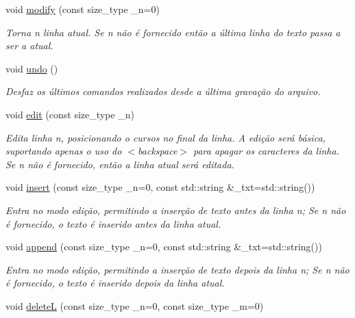 \begin{DoxyCompactItemize}
void \hyperlink{classelis_a863421e1b739bbaa727da3ec66333248}{modify} (const size\+\_\+type \+\_\+n=0)
\begin{DoxyCompactList}\small\item\em Torna n linha atual. Se n não é fornecido então a última linha do texto passa a ser a atual. \end{DoxyCompactList}\item 
\mbox{\label{classelis_a6a7a0e7b84b7021365deafc902765254}} 
void \hyperlink{classelis_a6a7a0e7b84b7021365deafc902765254}{undo} ()
\begin{DoxyCompactList}\small\item\em Desfaz os últimos comandos realizados desde a última gravação do arquivo. \end{DoxyCompactList}\item 
void \hyperlink{classelis_acba75acf4af664df02db7dca65393f19}{edit} (const size\+\_\+type \+\_\+n)
\begin{DoxyCompactList}\small\item\em Edita linha n, posicionando o cursos no final da linha. A edição será básica, suportando apenas o uso do $<$backspace$>$ para apagar os caracteres da linha. Se n não é fornecido, então a linha atual será editada. \end{DoxyCompactList}\item 
void \hyperlink{classelis_aa35b724716a8e628fa030d7c67978338}{insert} (const size\+\_\+type \+\_\+n=0, const std\+::string \&\+\_\+txt=std\+::string())
\begin{DoxyCompactList}\small\item\em Entra no modo edição, permitindo a inserção de texto antes da linha n; Se n não é fornecido, o texto é inserido antes da linha atual. \end{DoxyCompactList}\item 
void \hyperlink{classelis_a4efd2a55425f6bac58ededbc804ed794}{append} (const size\+\_\+type \+\_\+n=0, const std\+::string \&\+\_\+txt=std\+::string())
\begin{DoxyCompactList}\small\item\em Entra no modo edição, permitindo a inserção de texto depois da linha n; Se n não é fornecido, o texto é inserido depois da linha atual. \end{DoxyCompactList}\item 
void \hyperlink{classelis_ac393142dde010808f56a76e3914886a4}{deleteL} (const size\+\_\+type \+\_\+n=0, const size\+\_\+type \+\_\+m=0)

\end{DoxyCompactItemize}
